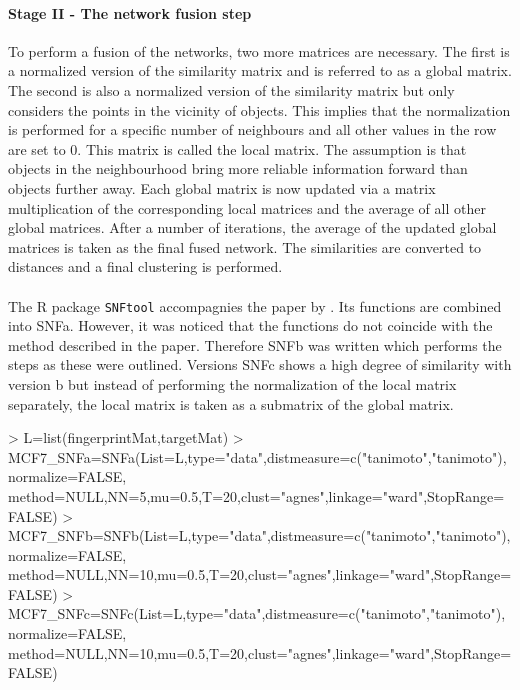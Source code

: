 \documentclass[a4paper]{article}
\begin{document}
\paragraph{Stage II - The network fusion step}
To perform a fusion of the networks, two more matrices are necessary. The first
is a normalized version of the similarity matrix and is referred to as a global
matrix. The second is also a normalized version of the similarity matrix but
only considers the points in the vicinity of objects. This implies that the
normalization is performed for a specific number of neighbours and all other
values in the row are set to $0$. This matrix is called the local matrix. The assumption is
that objects in the neighbourhood bring more reliable information forward
than objects further away. Each global matrix is now updated via a matrix
multiplication of the corresponding local matrices and the average of all other
global matrices. After a number of iterations, the average of the updated global
matrices is taken as the final fused network. The similarities are converted to
distances and a final clustering is performed.\\ \\
The R package \texttt{SNFtool} accompagnies the paper by \cite{Wang2014}.
Its functions are combined into SNFa. However, it was noticed that the functions 
do not coincide with the method described in the paper. Therefore SNFb was
written which performs the steps as these were outlined. Versions SNFc shows a
high degree of similarity with version b but instead of performing the
normalization of the local matrix separately, the local matrix is taken as a
submatrix of the global matrix.
\begin{Schunk}
\begin{Sinput}
> L=list(fingerprintMat,targetMat)
> MCF7_SNFa=SNFa(List=L,type="data",distmeasure=c("tanimoto","tanimoto"),normalize=FALSE,
                method=NULL,NN=5,mu=0.5,T=20,clust="agnes",linkage="ward",StopRange=FALSE)
> MCF7_SNFb=SNFb(List=L,type="data",distmeasure=c("tanimoto","tanimoto"),normalize=FALSE,
                method=NULL,NN=10,mu=0.5,T=20,clust="agnes",linkage="ward",StopRange=FALSE)
> MCF7_SNFc=SNFc(List=L,type="data",distmeasure=c("tanimoto","tanimoto"),normalize=FALSE,
                method=NULL,NN=10,mu=0.5,T=20,clust="agnes",linkage="ward",StopRange=FALSE)	   
\end{Sinput}
\end{Schunk}
\end{document}
